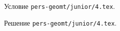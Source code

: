 \problem
Условие \texttt{pers-geomt/junior/4.tex}.

\solution Решение \texttt{pers-geomt/junior/4.tex}.
\endproblem

